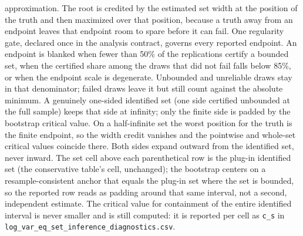 \begin{table}[!htbp]
\begin{threeparttable}
\begin{tablenotes}[flushleft]
approximation. The root is credited by the estimated set width at the position of the truth and then maximized over that position, because a truth away from an endpoint leaves that endpoint room to spare before it can fail. One regularity gate, declared once in the analysis contract, governs every reported endpoint. An endpoint is blanked when fewer than 50\% of the replications certify a bounded set, when the certified share among the draws that did not fail falls below 85\%, or when the endpoint scale is degenerate. Unbounded and unreliable draws stay in that denominator; failed draws leave it but still count against the absolute minimum. A genuinely one-sided identified set (one side certified unbounded at the full sample) keeps that side at infinity; only the finite side is padded by the bootstrap critical value. On a half-infinite set the worst position for the truth is the finite endpoint, so the width credit vanishes and the pointwise and whole-set critical values coincide there. Both sides expand outward from the identified set, never inward. The set cell above each parenthetical row is the plug-in identified set (the conservative table's cell, unchanged); the bootstrap centers on a resample-consistent anchor that equals the plug-in set where the set is bounded, so the reported row reads as padding around that same interval, not a second, independent estimate. The critical value for containment of the entire identified interval is never smaller and is still computed: it is reported per cell as \texttt{c\_s} in \texttt{log\_var\_eq\_set\_inference\_diagnostics.csv}.
\end{tablenotes}
\end{threeparttable}
\end{table}
\clearpage
